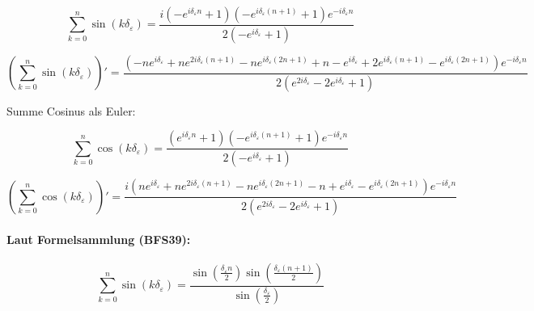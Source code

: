 \documentclass[10pt,a4paper]{article}
\begin{document}
\begin{equation}
\sum_{k=0}^n \sin(k\delta_{\varepsilon}) = 
\frac{i \left(- e^{i \delta_{\varepsilon} n} + 1\right) \left(- e^{i \delta_{\varepsilon} \left(n + 1\right)} + 1\right) e^{- i \delta_{\varepsilon} n}}{2 \left(- e^{i \delta_{\varepsilon}} + 1\right)}
\end{equation}

\begin{equation}
\left( \sum_{k=0}^n \sin(k\delta_{\varepsilon}) \right)' = 
\frac{\left(- n e^{i \delta_{\varepsilon}} + n e^{2 i \delta_{\varepsilon} \left(n + 1\right)} - n e^{i \delta_{\varepsilon} \left(2 n + 1\right)} + n - e^{i \delta_{\varepsilon}} + 2 e^{i \delta_{\varepsilon} \left(n + 1\right)} - e^{i \delta_{\varepsilon} \left(2 n + 1\right)}\right) e^{- i \delta_{\varepsilon} n}}{2 \left(e^{2 i \delta_{\varepsilon}} - 2 e^{i \delta_{\varepsilon}} + 1\right)}
\end{equation}

Summe Cosinus als Euler:

\begin{equation}
\sum_{k=0}^n \cos(k\delta_{\varepsilon}) = 
\frac{\left(e^{i \delta_{\varepsilon} n} + 1\right) \left(- e^{i \delta_{\varepsilon} \left(n + 1\right)} + 1\right) e^{- i \delta_{\varepsilon} n}}{2 \left(- e^{i \delta_{\varepsilon}} + 1\right)}
\end{equation}

\begin{equation}
\left( \sum_{k=0}^n \cos(k\delta_{\varepsilon}) \right)' = 
\frac{i \left(n e^{i \delta_{\varepsilon}} + n e^{2 i \delta_{\varepsilon} \left(n + 1\right)} - n e^{i \delta_{\varepsilon} \left(2 n + 1\right)} - n + e^{i \delta_{\varepsilon}} - e^{i \delta_{\varepsilon} \left(2 n + 1\right)}\right) e^{- i \delta_{\varepsilon} n}}{2 \left(e^{2 i \delta_{\varepsilon}} - 2 e^{i \delta_{\varepsilon}} + 1\right)}
\end{equation}



\paragraph{Laut Formelsammlung (BFS39):} 

\begin{equation}
\sum_{k=0}^n \sin(k\delta_{\varepsilon}) = 
\frac{\sin{\left (\frac{\delta_{\varepsilon} n}{2} \right )} \sin{\left (\frac{\delta_{\varepsilon} \left(n + 1\right)}{2} \right )}}{\sin{\left (\frac{\delta_{\varepsilon}}{2} \right )}}
\end{equation}
\end{document}
